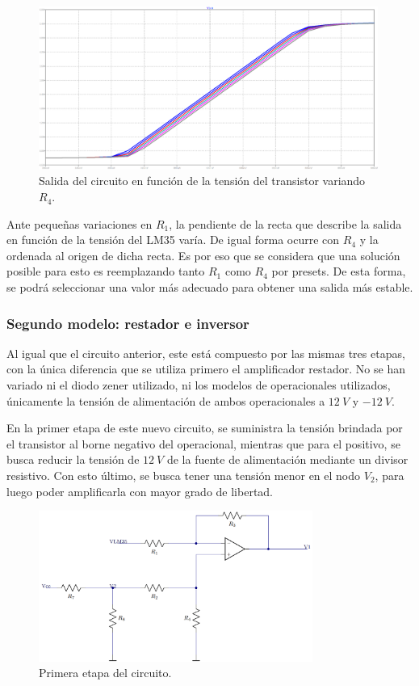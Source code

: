 \documentclass[a4paper]{article}
\begin{document}
\begin{figure}[H]
	\centering
	\includegraphics[width=0.99\textwidth]{Ejercicio6/Imagenes/StepR4-M1.png}
	\caption{Salida del circuito en función de la tensión del transistor variando $R_4$.}
	\label{fig:r4-M1}
\end{figure}

Ante pequeñas variaciones en $R_1$, la pendiente de la recta que describe la salida en función de la tensión del LM35 varía. De igual forma ocurre con $R_4$ y la ordenada al origen de dicha recta. Es por eso que se considera que una solución posible para esto es reemplazando tanto $R_1$ como $R_4$ por presets. De esta forma, se podrá seleccionar una valor más adecuado para obtener una salida más estable.

\subsubsection{Segundo modelo: restador e inversor}

Al igual que el circuito anterior, este está compuesto por las mismas tres etapas, con la única diferencia que se utiliza primero el amplificador restador. No se han variado ni el diodo zener utilizado, ni los modelos de operacionales utilizados, únicamente la tensión de alimentación de ambos operacionales a $12 \ V$ y $-12 \ V$.

En la primer etapa de este nuevo circuito, se suministra la tensión brindada por el transistor al borne negativo del operacional, mientras que para el positivo, se busca reducir la tensión de $12 \ V$ de la fuente de alimentación mediante un divisor resistivo. Con esto último, se busca tener una tensión menor en el nodo $V_2$, para luego poder amplificarla con mayor grado de libertad.

\begin{figure}[H]
	\centering
	\includegraphics[width=0.8\textwidth]{Ejercicio6/Imagenes/CircuitoEtapa1-M2.png}
\caption{Primera etapa del circuito.}
	\label{fig:cir1-M2}
\end{figure}
\end{document}
